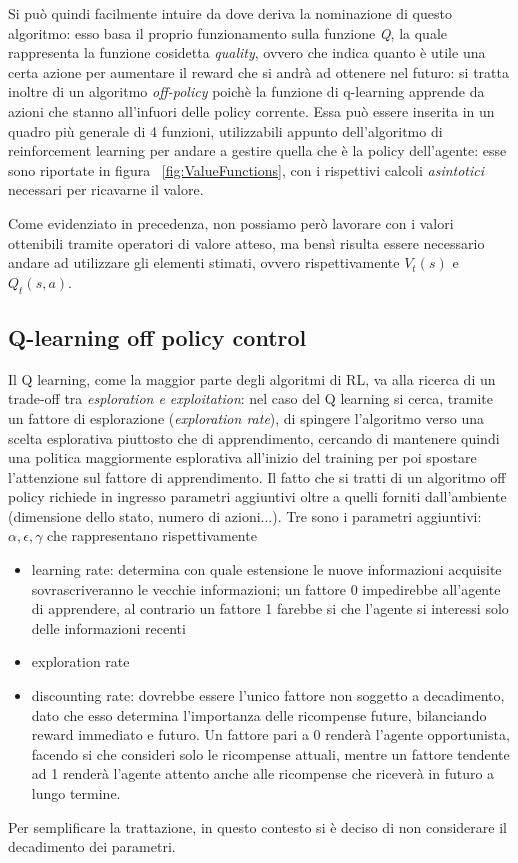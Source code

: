 Si può quindi facilmente intuire da dove deriva la nominazione di questo algoritmo: esso basa il proprio funzionamento sulla funzione \textit{Q}, la quale rappresenta la funzione cosidetta \textit{quality}, ovvero che indica quanto è utile una certa azione per aumentare il reward che si andrà ad ottenere nel futuro: si tratta inoltre di un algoritmo \textit{off-policy} poichè la funzione di q-learning apprende da azioni che stanno all'infuori delle policy corrente.
Essa può essere inserita in un quadro più generale di 4 funzioni, utilizzabili appunto dell'algoritmo di reinforcement learning per andare a gestire quella che è la policy dell'agente: esse sono riportate in figura ~\ref{fig:ValueFunctions}, con i rispettivi calcoli \textit{asintotici} necessari per ricavarne il valore.

Come evidenziato in precedenza, non possiamo però lavorare con i valori ottenibili tramite operatori di valore atteso, ma bensì risulta essere necessario andare ad utilizzare gli elementi stimati, ovvero rispettivamente $V_t(s)$ e $Q_t(s,a)$.

\subsection{Q-learning off policy control}
Il Q learning, come la maggior parte degli algoritmi di RL, va alla ricerca di un trade-off tra \textit{esploration e exploitation}: nel caso del Q learning si cerca, tramite un fattore di esplorazione (\textit{exploration rate}), di spingere l'algoritmo verso una scelta esplorativa piuttosto che di apprendimento, cercando di mantenere quindi una politica maggiormente esplorativa all'inizio del training per poi spostare l'attenzione sul fattore di apprendimento.
Il fatto che si tratti di un algoritmo off policy richiede in ingresso parametri aggiuntivi oltre a quelli forniti dall'ambiente (dimensione dello stato, numero di azioni...).
Tre sono i parametri aggiuntivi: $\alpha,\epsilon,\gamma$ che rappresentano rispettivamente 
\begin{itemize}
	\item learning rate: determina con quale estensione le nuove informazioni acquisite sovrascriveranno le vecchie informazioni; un fattore 0 impedirebbe all'agente di apprendere, al contrario un fattore 1 farebbe si che l'agente si interessi solo delle informazioni recenti
	\item exploration rate
	\item discounting rate: dovrebbe essere l'unico fattore non soggetto a decadimento, dato che esso determina l'importanza delle ricompense future, bilanciando reward immediato e futuro. Un fattore pari a 0 renderà l'agente opportunista, facendo si che consideri solo le ricompense attuali, mentre un fattore tendente ad 1 renderà l'agente attento anche alle ricompense che riceverà in futuro a lungo termine.
\end{itemize}
Per semplificare la trattazione, in questo contesto si è deciso di non considerare il decadimento dei parametri.

